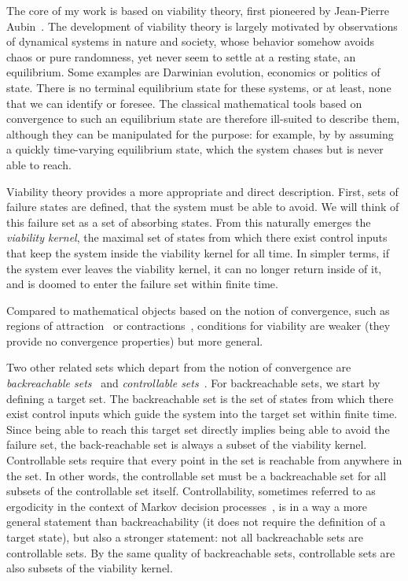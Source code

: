 The core of my work is based on viability theory, first pioneered by Jean-Pierre Aubin~\cite{aubin2011viability}. The development of viability theory is largely motivated by observations of dynamical systems in nature and society, whose behavior somehow avoids chaos or pure randomness, yet never seem to settle at a resting state, an equilibrium.
Some examples are Darwinian evolution, economics or politics of state. There is no terminal equilibrium state for these systems, or at least, none that we can identify or foresee.
The classical mathematical tools based on convergence to such an equilibrium state are therefore ill-suited to describe them, although they can be manipulated for the purpose: for example, by by assuming a quickly time-varying equilibrium state, which the system chases but is never able to reach. \par
Viability theory provides a more appropriate and direct description. First, sets of failure states are defined, that the system must be able to avoid. We will think of this failure set as a set of absorbing states. From this naturally emerges the \emph{viability kernel}, the maximal set of states from which there exist control inputs that keep the system inside the viability kernel for all time. In simpler terms, if the system ever leaves the viability kernel, it can no longer return inside of it, and is doomed to enter the failure set within finite time. \par
Compared to mathematical objects based on the notion of convergence, such as regions of attraction~\cite[(section 6.4)]{strogatz2018nonlinear} or contractions~\cite{bazzi2018stability}, conditions for viability are weaker (they provide no convergence properties) but more general. \par
Two other related sets which depart from the notion of convergence are \emph{backreachable sets}~\cite{bansal2017hamilton} and \emph{controllable sets}~\cite{zaytsev2018boundaries}. For backreachable sets, we start by defining a target set.
The backreachable set is the set of states from which there exist control inputs which guide the system into the target set within finite time.
Since being able to reach this target set directly implies being able to avoid the failure set, the back-reachable set is always a subset of the viability kernel.
Controllable sets require that every point in the set is reachable from anywhere in the set. In other words, the controllable set must be a backreachable set for all subsets of the controllable set itself. Controllability, sometimes referred to as ergodicity in the context of Markov decision processes~\cite{moldovan2012safemdp}, is in a way a more general statement than backreachability (it does not require the definition of a target state), but also a stronger statement: not all backreachable sets are controllable sets. By the same quality of backreachable sets, controllable sets are also subsets of the viability kernel. \par
